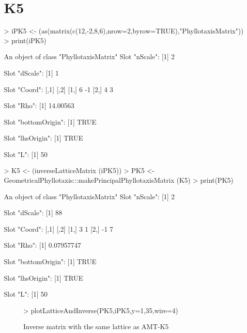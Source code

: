 \documentclass[a4paper]{article}
\begin{document}
\section{K5}
\begin{Schunk}
\begin{Sinput}
> iPK5 <- (as(matrix(c(12,-2,8,6),nrow=2,byrow=TRUE),"PhyllotaxisMatrix"))
> print(iPK5)
\end{Sinput}
\begin{Soutput}
An object of class "PhyllotaxisMatrix"
Slot "nScale":
[1] 2

Slot "dScale":
[1] 1

Slot "Coord":
     [,1] [,2]
[1,]    6   -1
[2,]    4    3

Slot "Rho":
[1] 14.00563

Slot "bottomOrigin":
[1] TRUE

Slot "lhsOrigin":
[1] TRUE

Slot "L":
[1] 50
\end{Soutput}
\begin{Sinput}
> K5 <- (inverseLatticeMatrix (iPK5))
> PK5 <- GeometricalPhyllotaxis:::makePrincipalPhyllotaxisMatrix (K5)
> print(PK5)
\end{Sinput}
\begin{Soutput}
An object of class "PhyllotaxisMatrix"
Slot "nScale":
[1] 2

Slot "dScale":
[1] 88

Slot "Coord":
     [,1] [,2]
[1,]    3    1
[2,]   -1    7

Slot "Rho":
[1] 0.07957747

Slot "bottomOrigin":
[1] TRUE

Slot "lhsOrigin":
[1] TRUE

Slot "L":
[1] 50
\end{Soutput}
\end{Schunk}
\begin{figure}\begin{center}
\begin{Schunk}
\begin{Sinput}
> plotLatticeAndInverse(PK5,iPK5,y=1,35,wire=4)
\end{Sinput}
\end{Schunk}
\caption{Inverse matrix with the same lattice as AMT-K5}
\end{center}
\end{figure}

\clearpage
\end{document}
